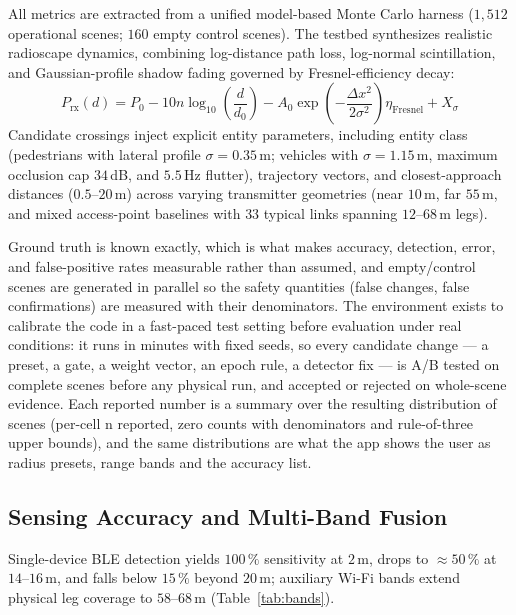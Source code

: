 \documentclass[journal,10pt]{IEEEtran}
\begin{document}
All metrics are extracted from a unified model-based Monte Carlo harness ($1{,}512$ operational scenes; $160$ empty control scenes). The testbed synthesizes realistic radioscape dynamics, combining log-distance path loss, log-normal scintillation, and Gaussian-profile shadow fading governed by Fresnel-efficiency decay:
\begin{equation}
P_{\mathrm{rx}}(d) = P_0 - 10n \log_{10}\left(\frac{d}{d_0}\right) - A_0 \exp\left(-\frac{\Delta x^2}{2\sigma^2}\right) \eta_{\mathrm{Fresnel}} + X_\sigma
\label{eq:pathloss}
\end{equation}
Candidate crossings inject explicit entity parameters, including entity class (pedestrians with lateral profile $\sigma = 0.35$\,m; vehicles with $\sigma = 1.15$\,m, maximum occlusion cap $34$\,dB, and $5.5$\,Hz flutter), trajectory vectors, and closest-approach distances ($0.5$--$20$\,m) across varying transmitter geometries (near $10$\,m, far $55$\,m, and mixed access-point baselines with $33$ typical links spanning $12$--$68$\,m legs).

Ground truth is known exactly, which is what makes accuracy, detection, error, and false-positive rates measurable rather than assumed, and empty/control scenes are generated in parallel so the safety quantities (false changes, false confirmations) are measured with their denominators. The environment exists to calibrate the code in a fast-paced test setting before evaluation under real conditions: it runs in minutes with fixed seeds, so every candidate change — a preset, a gate, a weight vector, an epoch rule, a detector fix — is A/B tested on complete scenes before any physical run, and accepted or rejected on whole-scene evidence. Each reported number is a summary over the resulting distribution of scenes (per-cell n reported, zero counts with denominators and rule-of-three upper bounds), and the same distributions are what the app shows the user as radius presets, range bands and the accuracy list.
\subsection{Sensing Accuracy and Multi-Band Fusion}
Single-device BLE detection yields $100\,\%$ sensitivity at $2$\,m, drops to $\approx 50\,\%$ at $14$--$16$\,m, and falls below $15\,\%$ beyond $20$\,m; auxiliary Wi-Fi bands extend physical leg coverage to $58$--$68$\,m (Table~\ref{tab:bands}).
\end{document}
